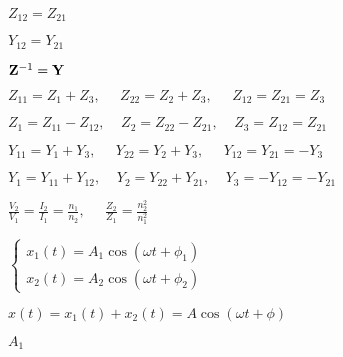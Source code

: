 \documentclass{article}
\def\lthtmlcheckvsize{\ifdim\ht\sizebox<\vsize 
  \ifdim\wd\sizebox<\hsize\expandafter\hfill\fi \expandafter\vfill
  \else\expandafter\vss\fi}%
\begin{document}
{\newpage\clearpage
{}%
$ Z_{12}=Z_{21}$%
\lthtmlindisplaymathZ
\lthtmlcheckvsize\clearpage}

{\newpage\clearpage
{}%
$ Y_{12}=Y_{21}$%
\lthtmlindisplaymathZ
\lthtmlcheckvsize\clearpage}

{\newpage\clearpage
{}%
$ {\bf Z}^{-1}={\bf Y}$%
\lthtmlindisplaymathZ
\lthtmlcheckvsize\clearpage}

{\newpage\clearpage
{}%
$\displaystyle Z_{11}=Z_1+Z_3,\;\;\;\;\;Z_{22}=Z_2+Z_3,\;\;\;\;\;Z_{12}=Z_{21}=Z_3$%
\lthtmlindisplaymathZ
\lthtmlcheckvsize\clearpage}

{\newpage\clearpage
{}%
$\displaystyle Z_1=Z_{11}-Z_{12},\;\;\;\;Z_2=Z_{22}-Z_{21},\;\;\;\;Z_3=Z_{12}=Z_{21}$%
\lthtmlindisplaymathZ
\lthtmlcheckvsize\clearpage}

{\newpage\clearpage
{}%
$\displaystyle Y_{11}=Y_1+Y_3,\;\;\;\;\;Y_{22}=Y_2+Y_3,\;\;\;\;\;Y_{12}=Y_{21}=-Y_3$%
\lthtmlindisplaymathZ
\lthtmlcheckvsize\clearpage}

{\newpage\clearpage
{}%
$\displaystyle Y_1=Y_{11}+Y_{12},\;\;\;\;Y_2=Y_{22}+Y_{21},\;\;\;\;Y_3=-Y_{12}=-Y_{21}$%
\lthtmlindisplaymathZ
\lthtmlcheckvsize\clearpage}

{\newpage\clearpage
{}%
$\displaystyle \frac{V_2}{V_1}=\frac{I_2}{I_1}=\frac{n_1}{n_2},\;\;\;\;\;
\frac{Z_2}{Z_1}=\frac{n^2_2}{n^2_1}$%
\lthtmlindisplaymathZ
\lthtmlcheckvsize\clearpage}

{\newpage\clearpage
{}%
$\displaystyle \left\{ \begin{array}{l} x_1(t)=A_1\cos(\omega t+\phi_1)\\
x_2(t)=A_2\cos(\omega t+\phi_2) \end{array} \right.$%
\lthtmlindisplaymathZ
\lthtmlcheckvsize\clearpage}

{\newpage\clearpage
{}%
$\displaystyle x(t)=x_1(t)+x_2(t)=A\cos(\omega t+\phi)$%
\lthtmlindisplaymathZ
\lthtmlcheckvsize\clearpage}

{\newpage\clearpage
{}%
$ A_1$%
\lthtmlindisplaymathZ
\lthtmlcheckvsize\clearpage}
\end{document}
